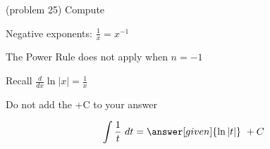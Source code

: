 \documentclass{ximera}
\begin{document}
\begin{problem}(problem 25)
Compute 

\begin{hint}
Negative exponents: $\frac{1}{x} = x^{-1}$
\end{hint}
\begin{hint}
The Power Rule does not apply when $n = -1$
\end{hint}
\begin{hint}
Recall $\frac{d}{dx} \ln|x| = \frac{1}{x}$
\end{hint}
\begin{hint}
\begin{center}
Do not add the +C to your answer
\end{center}
\end{hint}

\[
\int \frac{1}{t} \ dt =
\answer[given]{\ln|t|} \ + C
\]
\end{problem}
\end{document}
